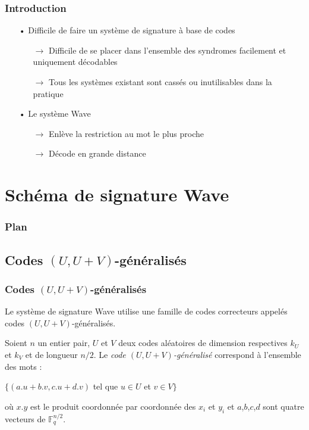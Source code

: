 \documentclass[10pt,a4paper]{beamer}
\theoremstyle{plain}
\theoremstyle{definition}
\newcommand{\F}{\mathbb{F}}
\begin{document}
\begin{frame}
\frametitle{Introduction}
\begin{itemize}    
\item[•] Difficile de faire un système de signature à base de codes 
       \begin{itemize}
       \item[$\rightarrow$] Difficile de se placer dans l'ensemble des syndromes facilement et \\uniquement décodables
       \item[$\rightarrow$] Tous les systèmes existant sont cassés ou inutilisables dans la pratique
       \end{itemize}
\vspace{0.2in}
\item[•] Le système Wave
       \begin{itemize}
       \item[$\rightarrow$] Enlève la restriction au mot le plus proche
       \item[$\rightarrow$]Décode en grande distance
       \end{itemize}
\end{itemize}   

\end{frame}

\section{Schéma de signature Wave}
\begin{frame}
  \frametitle{Plan}
  \tableofcontents[currentsection,subsectionstyle=hide]
\end{frame}

\subsection{Codes $(U,U+V)$-généralisés}

\begin{frame}
\frametitle{Codes $(U,U+V)$-généralisés} 

Le système de signature Wave utilise une famille de codes correcteurs appelés codes $(U,U+V)$-généralisés.
\vspace{0.15in}
\begin{block}{}
Soient $n$ un entier pair, $U$ et $V$ deux codes aléatoires de dimension respectives $k_U$ et $k_V$ et de longueur $n/2$. Le \textit{code $(U,U+V)$-généralisé } correspond à l'ensemble des mots :
\begin{center}
$ \{(a.u + b.v, c.u + d.v)$ tel que $u \in U$ et $v \in V \}$
\end{center}
\vspace{0.1in}
où $x.y$ est le produit coordonnée par coordonnée des $x_i$ et $y_i$ et $a$,$b$,$c$,$d$ sont quatre vecteurs de $\F_q^{n/2}$.
\end{block}
\end{frame}
\end{document}
